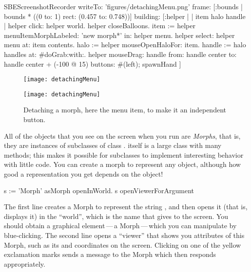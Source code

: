 \documentclass[a4paper,10pt,twoside]{book}
\begin{document}

\begin{ExecuteSmalltalkScript}
SBEScreenshotRecorder writeTo: 'figures/detachingMenu.png' frame: [:bounds | bounds * ((0 to: 1) rect: (0.457 to: 0.748))] building: [:helper |
	| item halo handle |
	helper click: helper world.
	helper closeBalloons.
	item := helper menuItemMorphLabeled: 'new morph*' in: helper menu.
	helper select: helper menu at: item contents.
	halo := helper mouseOpenHaloFor: item.
	handle := halo handles at: #doGrab:with:.
	helper
		mouseDrag: handle
			from: handle center
			to: handle center + (-100 @ 15)
			buttons: #(left);
		spawnHand
]
\end{ExecuteSmalltalkScript}
\begin{figure}[ht]
	\ifluluelse
		{\centerline{\texttt{[image: detachingMenu]}}}
		{\centerline{\texttt{[image: detachingMenu]}}}
	\caption{Detaching a morph, here the  menu item, to make it an independent button.
		\label{fig:detachingMenu}}
\end{figure}

All of the objects that you see on the screen when you run \sq are \emph{Morphs}, that is, they are instances of subclasses of class .
\mbox{} itself is a large class with many methods; this makes it possible for subclasses to implement interesting behavior with little code.
You can create a morph to represent any object, although how good a representation you get depends on the object!

\begin{code}{}
s := 'Morph' asMorph openInWorld.
s openViewerForArgument
\end{code}

The first line creates a Morph to represent the string , and then opens it (that is, displays it) in the ``world'', which is the name that \sq gives to the screen.
You should obtain a graphical element\,---\,a Morph\,---\,which you can manipulate by blue-clicking.
The second line opens a ``viewer'' that shows you attributes of this Morph, such as its  and  coordinates on the screen.
Clicking on one of the yellow exclamation marks sends a message to the Morph which then responds appropriately.
\end{document}
